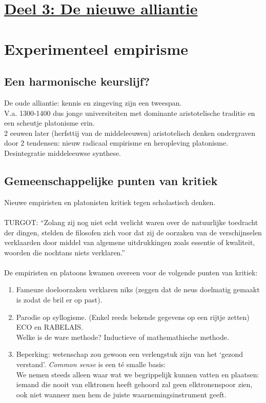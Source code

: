 \section*{\centering \underline{Deel 3: De nieuwe alliantie}}
\section{Experimenteel empirisme}
\subsection{Een harmonische keurslijf?}
De oude alliantie: kennis en zingeving zijn een tweespan.
\\
V.a. 1300-1400 dus jonge universiteiten met dominante aristotelische traditie en een scheutje platonisme erin.
\\
2 eeuwen later (herfsttij van de middeleeuwen) aristotelisch denken ondergraven door 2 tendensen: nieuw radicaal empirisme en heropleving platonisme.
\\
Desintegratie middeleeuwse synthese.
\subsection{Gemeenschappelijke punten van kritiek}
Nieuwe empiristen en platonisten kritiek tegen scholastisch denken.
\\
\\
TURGOT: “Zolang zij nog niet echt verlicht waren over de natuurlijke toedracht der dingen, stelden de filosofen zich voor dat zij de oorzaken van de verschijnselen verklaarden door middel van algemene uitdrukkingen zoals essentie of kwaliteit, woorden die nochtans niets verklaren.”
\\
\\
De empiristen en platoons kwamen overeen voor de volgende punten van kritiek:
\begin{enumerate}
\item Fameuze doeloorzaken verklaren niks (zeggen dat de neus doelmatig gemaakt is zodat de bril er op past).
\item Parodie op syllogisme. (Enkel reeds bekende gegevens op een rijtje zetten)
ECO en RABELAIS.
\\
Welke is de ware methode? Inductieve of mathemathische methode.
\item Beperking: wetenschap zou gewoon een verlengstuk zijn van het ‘gezond verstand’. \textit{Common sense} is een t\'e smalle basis:
\\We nemen steeds alleen waar wat we begrippelijk kunnen vatten en plaatsen: iemand die nooit van elktronen heeft gehoord zal geen elktronenspoor zien, ook niet wanneer men hem de juiste waarnemingsinstrument geeft.
\end{enumerate}
